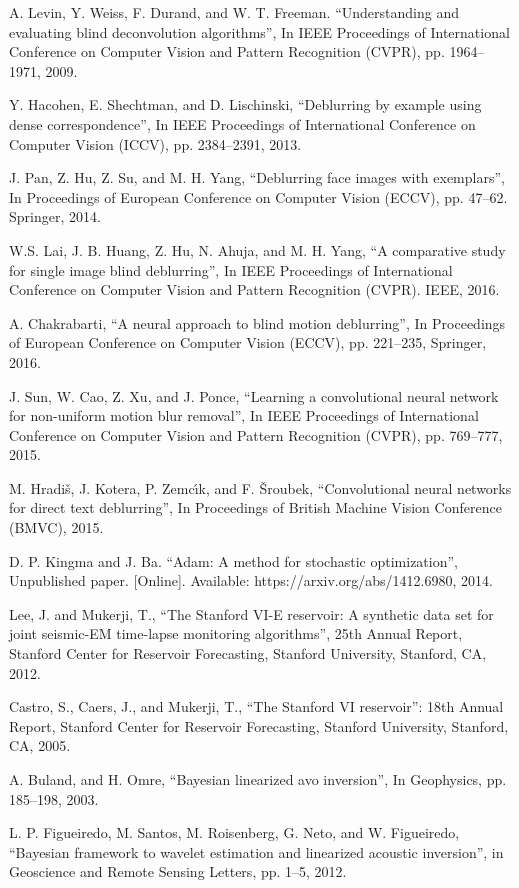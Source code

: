 \documentclass[journal]{IEEEtran}
\begin{document}
\begin{thebibliography}{1}
A. Levin, Y. Weiss, F. Durand, and W. T. Freeman. ``Understanding and evaluating blind deconvolution algorithms'', In IEEE Proceedings of International Conference on Computer Vision and Pattern Recognition (CVPR), pp. 1964--1971, 2009.

Y. Hacohen, E. Shechtman, and D. Lischinski, ``Deblurring by example using dense correspondence'', In IEEE Proceedings of International Conference on Computer Vision (ICCV), pp. 2384--2391, 2013.

J. Pan, Z. Hu, Z. Su, and M. H. Yang, ``Deblurring face images with exemplars'', In Proceedings of European Conference on Computer Vision (ECCV), pp. 47--62. Springer, 2014.

W.S. Lai, J. B. Huang, Z. Hu, N. Ahuja, and M. H. Yang, ``A comparative study for single image blind deblurring'', In IEEE Proceedings of International Conference on Computer Vision and Pattern Recognition (CVPR). IEEE, 2016.

A. Chakrabarti, ``A neural approach to blind motion deblurring'', In Proceedings of European Conference on Computer Vision (ECCV), pp. 221--235, Springer, 2016.

J. Sun, W. Cao, Z. Xu, and J. Ponce, ``Learning a convolutional neural network for non-uniform motion blur removal'', In IEEE Proceedings of International Conference on Computer Vision and Pattern Recognition (CVPR), pp. 769--777, 2015.

M. Hradiš, J. Kotera, P. Zemcı́k, and F. Šroubek, ``Convolutional neural networks for direct text deblurring'', In Proceedings of British Machine Vision Conference (BMVC), 2015.

D. P. Kingma and J. Ba. “Adam: A method for stochastic optimization”, Unpublished paper. [Online]. Available: https://arxiv.org/abs/1412.6980, 2014.

Lee, J. and Mukerji, T., ``The Stanford VI-E reservoir: A synthetic data set for joint seismic-EM time-lapse monitoring algorithms'', 25th Annual Report, Stanford Center for Reservoir Forecasting, Stanford University, Stanford, CA, 2012.

Castro, S., Caers, J., and Mukerji, T., “The Stanford VI reservoir”: 18th Annual Report, Stanford Center for Reservoir Forecasting, Stanford University, Stanford, CA, 2005.

A. Buland,  and H. Omre, ``Bayesian linearized avo inversion'', In Geophysics, pp. 185--198, 2003.

L. P. Figueiredo, M. Santos, M. Roisenberg, G. Neto, and W. Figueiredo, ``Bayesian framework to wavelet estimation and linearized acoustic inversion'', in Geoscience and Remote Sensing Letters, pp. 1--5, 2012.

\end{thebibliography}
\end{document}
